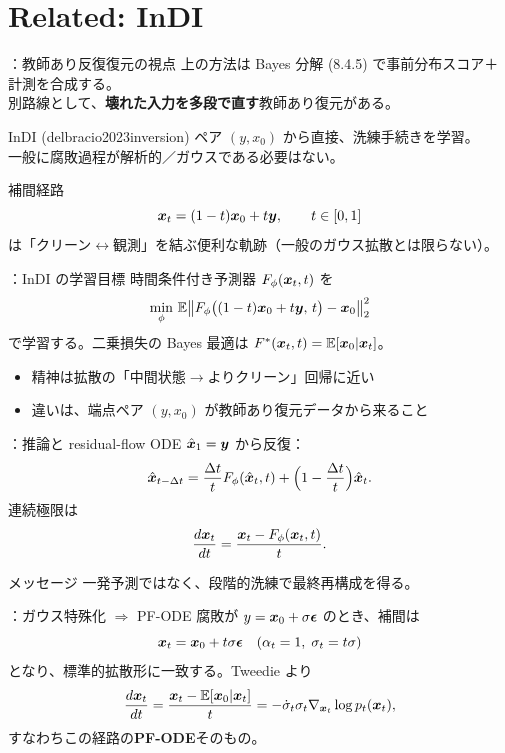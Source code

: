 \section{Related: InDI}
\assuppl
\begin{frame}{\supplmark：教師あり反復復元の視点}
    上の方法は Bayes 分解 (8.4.5) で事前分布スコア＋計測を合成する。\\
    別路線として、\textbf{壊れた入力を多段で直す}教師あり復元がある。
    \begin{block}{InDI (delbracio2023inversion)}
        ペア $(y,x_0)$ から直接、洗練手続きを学習。\\
        一般に腐敗過程が解析的／ガウスである必要はない。
    \end{block}
    補間経路
    \[
        \bm{x}_t=(1-t)\bm{x}_0+t\bm{y},
        \qquad t\in[0,1]
    \]
    は「クリーン$\leftrightarrow$観測」を結ぶ便利な軌跡（一般のガウス拡散とは限らない）。
\end{frame}
\assuppl
\begin{frame}{\supplmark：InDI の学習目標}
    時間条件付き予測器 $F_\phi(\bm{x}_t,t)$ を
    \[
        \min_\phi\,
        \mathbb{E}
        \bigl\|
            F_\phi\bigl((1-t)\bm{x}_0+t\bm{y},\,t\bigr)-\bm{x}_0
        \bigr\|_2^{2}
    \]
    で学習する。二乗損失の Bayes 最適は $F^*(\bm{x}_t,t)=\mathbb{E}[\bm{x}_0|\bm{x}_t]$。
    \begin{itemize}
        \item 精神は拡散の「中間状態$\to$よりクリーン」回帰に近い
        \item 違いは、端点ペア $(y,x_0)$ が教師あり復元データから来ること
    \end{itemize}
\end{frame}
\assuppl
\begin{frame}{\supplmark：推論と residual-flow ODE}
    $\hat{\bm{x}}_1=\bm{y}$ から反復：
    \[
        \hat{\bm{x}}_{t-\Delta t}
        =
        \frac{\Delta t}{t}F_\phi(\hat{\bm{x}}_t,t)
        +\Bigl(1-\frac{\Delta t}{t}\Bigr)\hat{\bm{x}}_t.
    \]
    連続極限は
    \[
        \frac{d\bm{x}_t}{dt}
        =
        \frac{\bm{x}_t-F_\phi(\bm{x}_t,t)}{t}.
    \]
    \begin{exampleblock}{メッセージ}
        一発予測ではなく、段階的洗練で最終再構成を得る。
    \end{exampleblock}
\end{frame}
\assuppl
\begin{frame}{\supplmark：ガウス特殊化 $\Rightarrow$ PF-ODE}
    腐敗が $y=\bm{x}_0+\sigma\bm{\epsilon}$ のとき、補間は
    \[
        \bm{x}_t=\bm{x}_0+t\sigma\bm{\epsilon}
        \quad(\alpha_t=1,\;\sigma_t=t\sigma)
    \]
    となり、標準的拡散形に一致する。Tweedie より
    \[
        \frac{d\bm{x}_t}{dt}
        =
        \frac{\bm{x}_t-\mathbb{E}[\bm{x}_0|\bm{x}_t]}{t}
        =
        -\dot\sigma_t\sigma_t\nabla_{\bm{x}_t}\log p_t(\bm{x}_t),
    \]
    すなわちこの経路の\textbf{PF-ODE}そのもの。
\end{frame}

